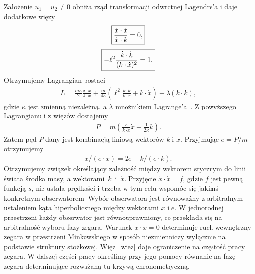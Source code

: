 Założenie 
$u_1 = u_2 \neq 0$ obniża rząd transformacji 
odwrotnej Lagendre'a i daje dodatkowe więzy 
\begin{align}\boxed{
\label{wiezD}
\frac{\dot{x}\cdot\dot{x}}{\dot{x}\cdot k}=0, 
}
\end{align}
\begin{align} 
\boxed{
\label{wiez}
 - \ell^2 \frac{\dot{k} \cdot \dot{k}}{ ( k \cdot \dot{x})^2 } = 1 .
}
\end{align}
Otrzymujemy Lagrangian postaci
\begin{align*}\boxed{
L  = \frac{m \kappa}{2} \frac{\dot{x}\cdot\dot{x}}{k\cdot\dot{x}}
+ \frac{m }{4 \kappa} 
 \left( \ell^2 \frac{\dot{k} \cdot \dot{k}}{  k \cdot \dot{x} } + 
k\cdot\dot{x} \right) + \lambda (k\cdot k),}
\end{align*}
gdzie $\kappa $ jest zmienną niezależną, a $\lambda$ 
mnożnikiem Lagrange'a~\cite{Bratek2015wiele}.
Z powyższego Lagrangianu i z więzów dostajemy
\begin{align*}
P = m \left( \frac{\kappa}{k\cdot \dot{x}} \dot{x}+ \frac{1}{2\kappa} k\right).
\end{align*}
Zatem pęd $P$ dany jest kombinacją liniową wektorów $k$ i $\dot{x}$. Przyjmując
$e=P/m$ otrzymujemy
\begin{align}\label{r123}
\dot{x} / (e\cdot \dot{x}) = 
2 e - k / (e\cdot k).
\end{align}
Otrzymujemy związek określający zależność między wektorem 
stycznym do linii świata środka masy, a wektorami~$k$~i~$\dot{x}$.
Przyjęcie $\dot{x} \cdot \dot{x} = f$, gdzie $f$ jest pewną 
funkcją $s$, nie ustala prędkości 
i trzeba w tym celu wspomóc się jakimś konkretnym obserwatorem.
Wybór obserwatora jest równoważny z arbitralnym ustaleniem 
kąta hiperbolicznego między wektorami $\dot{x}$ 
i $e$. W jednorodnej przestrzeni każdy obserwator jest 
równouprawniony, co przekłada się na arbitralność
wyboru fazy zegara. 
Warunek $\dot{x} \cdot \dot{x} = 0$ determinuje ruch wewnętrzny zegara 
w przestrzeni Minkowskiego w sposób niezmienniczy wyłącznie na 
podstawie struktury stożkowej. 
Więz~\eqref{wiez} daje ograniczenie na częstość pracy zegara. 
W dalszej części pracy określimy przy jego pomocy równanie na 
fazę zegara determinujące rozważaną tu krzywą chronometryczną.

